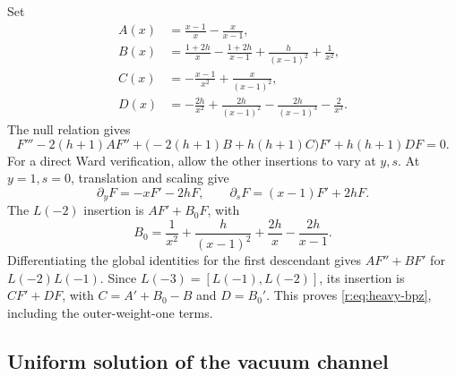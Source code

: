 \documentclass[11pt,a4paper]{article}
\numberwithin{equation}{section}
\theoremstyle{definition}\newtheorem{definition}[theorem]{Definition}
\theoremstyle{remark}\newtheorem{remark}[theorem]{Remark}
\begin{document}
Set
\begin{align*}
 A(x)&=\frac{x-1}{x}-\frac{x}{x-1},\\
 B(x)&=\frac{1+2h}{x}-\frac{1+2h}{x-1}
                  +\frac h{(x-1)^2}+\frac1{x^2},\\
 C(x)&=-\frac{x-1}{x^2}+\frac{x}{(x-1)^2},\\
 D(x)&=-\frac{2h}{x^2}+\frac{2h}{(x-1)^2}
                  -\frac{2h}{(x-1)^3}-\frac2{x^3}.
\end{align*}
The null relation gives
\begin{equation}
 F'''-2(h+1)AF''+
 \bigl(-2(h+1)B+h(h+1)C\bigr)F'+h(h+1)DF=0.
 \label{r:eq:heavy-bpz}
\end{equation}
For a direct Ward verification, allow the other insertions to vary at
$y,s$.  At $y=1,s=0$, translation and scaling give
\[
 \partial_yF=-xF'-2hF,\qquad
 \partial_sF=(x-1)F'+2hF.
\]
The $L(-2)$ insertion is $AF'+B_0F$, with
\[
 B_0=\frac1{x^2}+\frac h{(x-1)^2}+\frac{2h}{x}-\frac{2h}{x-1}.
\]
Differentiating the global identities for the first descendant gives
$AF''+BF'$ for $L(-2)L(-1)$.  Since
$L(-3)=[L(-1),L(-2)]$, its insertion is $CF'+DF$, with
$C=A'+B_0-B$ and $D=B_0'$.  This proves
\eqref{r:eq:heavy-bpz}, including the outer-weight-one terms.

\subsection{Uniform solution of the vacuum channel}
\end{document}
